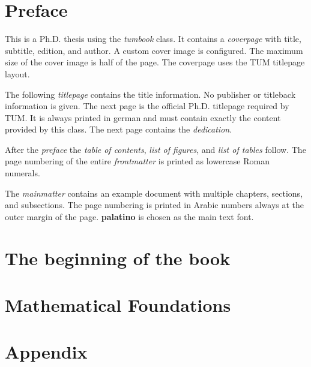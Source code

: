 \documentclass[thesis=phd,font=palatino]{tumbook}
\begin{document}
\frontmatter
\maketitle

\chapter{Preface}
 {\color{TUMOrange}This is a Ph.D. thesis using the \emph{tumbook} class.
  It contains a \emph{coverpage} with title, subtitle, edition, and author.
  A custom cover image is configured. The maximum size of the cover image is
  half of the page. The coverpage uses the TUM titlepage layout.\par
  The following \emph{titlepage} contains the title information. No publisher
  or titleback information is given.
  The next page is the official Ph.D. titlepage required by TUM. It is always
  printed in german and must contain exactly the content provided by this
  class. The next page contains the \emph{dedication}.\par
  After the \emph{preface} the \emph{table of contents},
  \emph{list of figures}, and \emph{list of tables} follow.
  The page numbering of the entire \emph{frontmatter} is printed as
  lowercase Roman numerals.\par
  The \emph{mainmatter} contains an example document with multiple chapters,
  sections, and subsections. The page numbering is printed in Arabic numbers
  always at the outer margin of the page. \textbf{palatino} is chosen as the
  main text font.
 }

\lipsum[1-4]
\cleardoublepage

\tableofcontents
\listoffigures
\listoftables

\mainmatter
\chapter{The beginning of the book}


\chapter{Mathematical Foundations}


\appendix
\chapter{Appendix}


\backmatter


\end{document}
